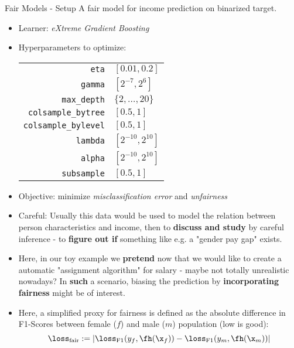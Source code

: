 \begin{frame}[allowframebreaks]{Fair Models - Setup}
  A fair model for income prediction on binarized target.
\begin{itemize}
  \item Learner: \emph{eXtreme Gradient Boosting}
  \item Hyperparameters to optimize: \\
  \begin{tabular}{rl}
    \texttt{eta} & $[0.01,0.2]$ \\
    \texttt{gamma} & $[2^{-7},2^6]$ \\
    \texttt{max\_depth} & $\{2, \ldots, 20\}$ \\
    \texttt{colsample\_bytree} & $[0.5,1]$ \\
    \texttt{colsample\_bylevel} & $[0.5,1]$ \\
    \texttt{lambda} & $[2^{-10},2^{10}]$ \\
    \texttt{alpha} & $[2^{-10},2^{10}]$ \\
    \texttt{subsample} & $[0.5,1]$ \\
  \end{tabular}
  \item Objective: minimize \emph{misclassification error} and \emph{unfairness}
  \item Careful: Usually this data would be used to model the relation between person characteristics and income, then to \textbf{discuss and study} by careful inference - to \textbf{figure out if} something like e.g. a "gender pay gap" exists.
  \item Here, in our toy example we \textbf{pretend} now that we would like to create a automatic "assignment algorithm" for salary - maybe not totally unrealistic nowadays? In \textbf{such} a scenario, biasing the prediction by \textbf{incorporating fairness} might be of interest.
  \item Here, a simplified proxy for fairness is defined as the absolute difference in F1-Scores between female ($f$) and male ($m$) population (low is good):
  \[
  \loss_{\text{fair}} := |\loss_{\text{F1}}(y_f,\fh(\x_f)) - \loss_{\text{F1}}(y_m,\fh(\x_m))|
  \]
\end{itemize}
\vspace{1em}

\end{frame}

